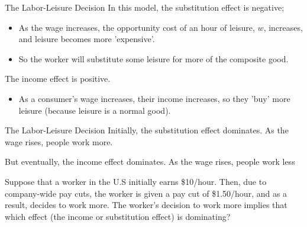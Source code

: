 \documentclass[12pt,t]{beamer}
\begin{document}
\begin{frame}{The Labor-Leisure Decision}
  In this model, the substitution effect is negative;
  
  \bigskip
  \begin{itemize}
    \item As the wage increases, the opportunity cost of an hour of leisure, $w$, increases, and leisure becomes more 'expensive'.

    \item So the worker will substitute some leisure for more of the composite good.
  \end{itemize}
  
  \bigskip\pause
  The income effect is positive.

  \bigskip
  \begin{itemize}
    \item As a consumer's wage increases, their income increases, so they 'buy' more leisure (because leisure is a normal good).
  \end{itemize}
\end{frame}

\begin{frame}{The Labor-Leisure Decision}
  Initially, the substitution effect dominates. As the wage rises, people work more.
  
  \bigskip 
  But eventually, the income effect dominates. As the wage rises, people work less
\end{frame}

\begin{frame}
  
  \bigskip
  Suppose that a worker in the U.S initially earns \$10/hour. Then, due to company-wide pay cuts, the worker is given a pay cut of \$1.50/hour, and as a result, decides to work more. The worker's decision to work more implies that which effect (the income or substitution effect) is dominating?
\end{frame}
\end{document}
